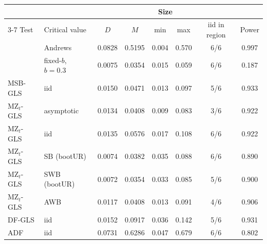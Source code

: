 \begin{tabular}{llcccccc}
\toprule
& & \multicolumn{5}{c}{Size} & \\
\cmidrule(lr){3-7}
Test & Critical value & $D$ & $M$ & min & max & iid in region & Power \\
\midrule
\RMGLS{} & Andrews & 0.0828 & 0.5195 & 0.004 & 0.570 & 6/6 & 0.997 \\
\RMGLS{} & fixed-$b$, $b = 0.3$ & 0.0075 & 0.0354 & 0.015 & 0.059 & 6/6 & 0.187 \\
\addlinespace
MSB-GLS & iid & 0.0150 & 0.0471 & 0.013 & 0.097 & 5/6 & 0.933 \\
\addlinespace
MZ$_t$-GLS & asymptotic & 0.0134 & 0.0408 & 0.009 & 0.083 & 3/6 & 0.922 \\
MZ$_t$-GLS & iid & 0.0135 & 0.0576 & 0.017 & 0.108 & 6/6 & 0.922 \\
MZ$_t$-GLS & SB (bootUR) & 0.0074 & 0.0382 & 0.035 & 0.088 & 6/6 & 0.890 \\
MZ$_t$-GLS & SWB (bootUR) & 0.0072 & 0.0354 & 0.033 & 0.085 & 5/6 & 0.900 \\
MZ$_t$-GLS & AWB & 0.0117 & 0.0408 & 0.013 & 0.091 & 4/6 & 0.906 \\
\addlinespace
DF-GLS & iid & 0.0152 & 0.0917 & 0.036 & 0.142 & 5/6 & 0.931 \\
\addlinespace
ADF & iid & 0.0731 & 0.6286 & 0.047 & 0.679 & 6/6 & 0.802 \\
\bottomrule
\end{tabular}
